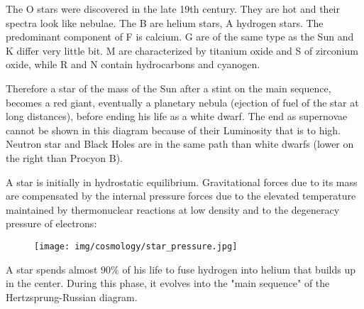 	The O stars were discovered in the late 19th century. They are hot and their spectra look like nebulae. The B are helium stars, A hydrogen stars. The predominant component of F is calcium. G are of the same type as the Sun and K differ very little bit. M are characterized by titanium oxide and S of zirconium oxide, while R and N contain hydrocarbons and cyanogen.
	
	Therefore a star of the mass of the Sun after a stint on the main sequence, becomes a red giant, eventually a planetary nebula (ejection of fuel of the star at long distances), before ending his life as a white dwarf. The end as supernovae cannot be shown in this diagram because of their Luminosity that is to high. Neutron star and Black Holes are in the same path than white dwarfs (lower on the right than Procyon B).
	
	A star is initially in hydrostatic equilibrium. Gravitational forces due to its mass are compensated by the internal pressure forces due to the elevated temperature maintained by thermonuclear reactions at low density and to the degeneracy pressure of electrons: 
	\begin{figure}[H]
		\begin{center}
		\texttt{[image: img/cosmology/star\_pressure.jpg]}
		\end{center}	
	\end{figure}	
	A star spends almost $90\%$ of his life to fuse hydrogen into helium that builds up in the center. During this phase, it evolves into the "main sequence" of the Hertzsprung-Russian diagram.
	
